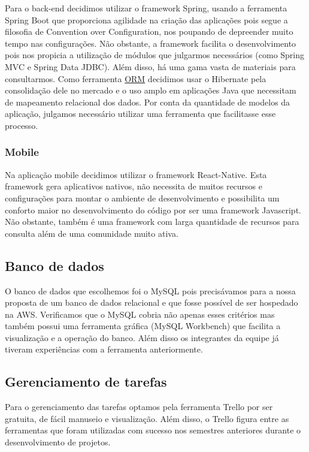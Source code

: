 Para o back-end decidimos utilizar o framework Spring, usando a ferramenta Spring Boot que proporciona agilidade na criação das aplicações pois segue a filosofia de Convention over Configuration\cite{Devopedia2020}, nos poupando de depreender muito tempo nas configurações. Não obstante, a framework facilita o desenvolvimento pois nos propicia a utilização de módulos que julgarmos necessários (como Spring MVC e Spring Data JDBC). Além disso, há uma gama vasta de materiais para consultarmos.
Como ferramenta \label{sig:ORM}\hyperlink{s:ORM}{ORM} decidimos usar o Hibernate pela consolidação dele no mercado e o uso amplo em aplicações Java que necessitam de mapeamento relacional dos dados. Por conta da quantidade de modelos da aplicação, julgamos necessário utilizar uma ferramenta que facilitasse esse processo. 

\subsubsection{Mobile}
Na aplicação mobile decidimos utilizar o framework React-Native. Esta framework gera aplicativos nativos, não necessita de muitos recursos e configurações para montar o ambiente de desenvolvimento e possibilita um conforto maior no desenvolvimento do código por ser uma framework Javascript. Não obstante, também é uma framework com larga quantidade de recursos para consulta além de uma comunidade muito ativa.

\subsection{Banco de dados}
O banco de dados que escolhemos foi o MySQL pois precisávamos para a nossa proposta de um banco de dados relacional e que fosse possível de ser hospedado na AWS. Verificamos que o MySQL cobria não apenas esses critérios mas também possui uma ferramenta gráfica (MySQL Workbench) que facilita a visualização e a operação do banco. Além disso os integrantes da equipe já tiveram experiências com a ferramenta anteriormente.

\subsection{Gerenciamento de tarefas}
Para o gerenciamento das tarefas optamos pela ferramenta Trello por ser gratuita, de fácil manuseio e visualização.
Além disso, o Trello figura entre as ferramentas que foram utilizadas com sucesso nos semestres anteriores durante o desenvolvimento de projetos.

